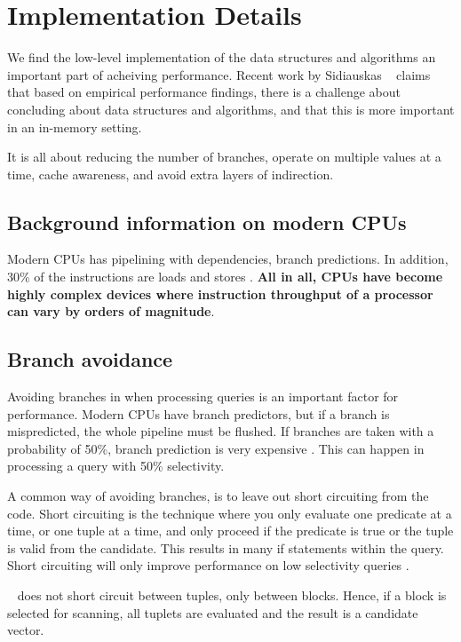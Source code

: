 \chapter{Implementation Details}
\label{chap:Implementation Details}
We find the low-level implementation of the data structures and algorithms an important part of acheiving performance. Recent work by Sidiauskas \ea~\cite{Sidiauskas2014-ef} claims that based on empirical performance findings, there is a challenge about concluding about data structures and algorithms, and that this is more important in an in-memory setting.

It is all about reducing the number of branches, operate on multiple values at a time, cache awareness, and avoid extra layers of indirection.
\newpage

\section{Background information on modern CPUs}
\label{sec:Background information on modern CPUs}
Modern CPUs has pipelining with dependencies, branch predictions. In addition, 30\% of the instructions are loads and stores \cite{Boncz2005-wj}. \textbf{All in all, CPUs have become highly complex devices where instruction throughput of a processor can vary by orders of magnitude}. 

\section{Branch avoidance}
\label{sec:Branch avoidance}
Avoiding branches in when processing queries is an important factor for performance. Modern CPUs have branch predictors, but if a branch is mispredicted, the whole pipeline must be flushed. If branches are taken with a probability of 50\%, branch prediction is very expensive \cite{Neumann2011-uq}. This can happen in processing a query with 50\% selectivity. 

A common way of avoiding branches, is to leave out short circuiting from the code. Short circuiting is the technique where you only evaluate one predicate at a time, or one tuple at a time, and only proceed if the predicate is true or the tuple is valid from the candidate. This results in many if statements within the query. Short circuiting will only improve performance on low selectivity queries \cite{Johnson2008-cp}.

\blink~\cite{Johnson2008-cp} does not short circuit between tuples, only between blocks. Hence, if a block is selected for scanning, all tuplets are evaluated and the result is a candidate vector.

